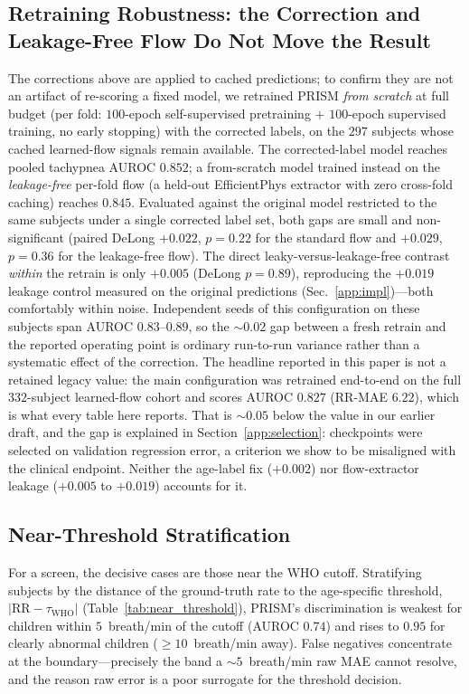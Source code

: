 \subsection{Retraining Robustness: the Correction and Leakage-Free Flow Do Not Move the Result}
The corrections above are applied to cached predictions; to confirm they are not an artifact of re-scoring
a fixed model, we retrained PRISM \emph{from scratch} at full budget (per fold: $100$-epoch self-supervised
pretraining $+$ $100$-epoch supervised training, no early stopping) with the corrected labels, on the $297$
subjects whose cached learned-flow signals remain available. The corrected-label model reaches pooled
tachypnea AUROC $0.852$; a from-scratch model trained instead on the \emph{leakage-free} per-fold flow (a
held-out EfficientPhys extractor with zero cross-fold caching) reaches $0.845$. Evaluated against the
original model restricted to the same subjects under a single corrected label set, both gaps are small and
non-significant (paired DeLong $+0.022$, $p=0.22$ for the standard flow and $+0.029$, $p=0.36$ for the
leakage-free flow). The direct leaky-versus-leakage-free contrast \emph{within} the retrain is only $+0.005$
(DeLong $p=0.89$), reproducing the $+0.019$ leakage control measured on the original predictions
(Sec.~\ref{app:impl})---both comfortably within noise. Independent seeds of this configuration on these subjects span
AUROC $0.83$--$0.89$, so the ${\sim}0.02$ gap between a fresh retrain and the reported operating point is
ordinary run-to-run variance rather than a systematic effect of the correction. The headline reported in
this paper is not a retained legacy value: the main configuration was retrained end-to-end on the full
$332$-subject learned-flow cohort and scores AUROC $0.827$ (RR-MAE $6.22$), which is what every table
here reports. That is ${\sim}0.05$ below the value in our earlier draft, and the gap is explained in
Section~\ref{app:selection}: checkpoints were selected on validation regression error, a criterion we
show to be misaligned with the clinical endpoint. Neither the age-label fix ($+0.002$) nor
flow-extractor leakage ($+0.005$ to $+0.019$) accounts for it.

\subsection{Near-Threshold Stratification}
For a screen, the decisive cases are those near the WHO cutoff. Stratifying subjects by the distance of
the ground-truth rate to the age-specific threshold, $|\mathrm{RR}-\tau_{\text{WHO}}|$
(Table~\ref{tab:near_threshold}), PRISM's discrimination is weakest for children within $5$~breath/min of
the cutoff (AUROC $0.74$) and rises to $0.95$ for clearly abnormal children ($\ge 10$~breath/min away).
False negatives concentrate at the boundary---precisely the band a $\sim$$5$~breath/min raw MAE cannot
resolve, and the reason raw error is a poor surrogate for the threshold decision.


